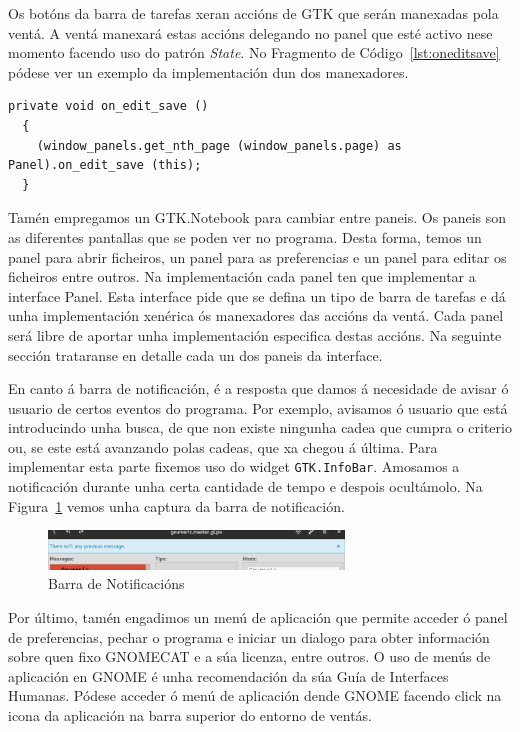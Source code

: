 Os botóns da barra de tarefas xeran accións de GTK que serán manexadas pola ventá. A ventá manexará estas accións delegando no panel que esté activo nese momento facendo uso do patrón \emph{State}\cite{book:gang4pat}. No Fragmento de Código~\ref{lst:oneditsave} pódese ver un exemplo da implementación dun dos manexadores.

\lstset{language=[sharp]C}
\begin{lstlisting}[label=lst:oneditsave,caption=Implemenación do manexador da acción gardar]
  private void on_edit_save ()
  {
    (window_panels.get_nth_page (window_panels.page) as Panel).on_edit_save (this);
  }
\end{lstlisting}

Tamén empregamos un GTK.Notebook para cambiar entre paneis. Os paneis son as diferentes pantallas que se poden ver no programa. Desta forma, temos un panel para abrir ficheiros, un panel para as preferencias e un panel para editar os ficheiros entre outros. Na implementación cada panel ten que implementar a interface Panel. Esta interface pide que se defina un tipo de barra de tarefas e dá unha implementación xenérica ós manexadores das accións da ventá. Cada panel será libre de aportar unha implementación especifica destas accións. Na seguinte sección trataranse en detalle cada un dos paneis da interface.

En canto á barra de notificación, é a resposta que damos á necesidade de avisar ó usuario de certos eventos do programa. Por exemplo, avisamos ó usuario que está introducindo unha busca, de que non existe ningunha cadea que cumpra o criterio ou, se este está avanzando polas cadeas, que xa chegou á última. Para implementar esta parte fixemos uso do widget \lstinline{GTK.InfoBar}. Amosamos a notificación durante unha certa cantidade de tempo e despois ocultámolo. Na Figura~\ref{fig:ui:v3:infobar} vemos unha captura da barra de notificación.

\begin{figure}[h!]
  \centering
    \includegraphics[width=0.7\textwidth]{img/gsoc2_it3_ui.png}
    \caption{Barra de Notificacións}
    \label{fig:ui:v3:infobar}
\end{figure}

Por último, tamén engadimos un menú de aplicación que permite acceder ó panel de preferencias, pechar o programa e iniciar un dialogo para obter información sobre quen fixo GNOMECAT e a súa licenza, entre outros. O uso de menús de aplicación en GNOME é unha recomendación da súa Guía de Interfaces Humanas. Pódese acceder ó menú de aplicación dende GNOME facendo click na icona da aplicación na barra superior do entorno de ventás.

